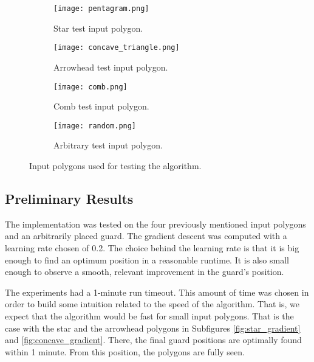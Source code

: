 \begin{figure}[h!]
    \centering
    \begin{subfigure}{0.45\textwidth}
        \centering
        \texttt{[image: pentagram.png]}
        \caption{Star test input polygon.}
        \label{fig:star}
    \end{subfigure}
    \begin{subfigure}{0.45\textwidth}
        \centering
        \texttt{[image: concave\_triangle.png]}
        \caption{Arrowhead test input polygon.}
        \label{fig:concave}
    \end{subfigure}
    \begin{subfigure}{0.45\textwidth}
        \centering
        \texttt{[image: comb.png]}
        \caption{Comb test input polygon.}
        \label{fig:comb}
    \end{subfigure}
    \begin{subfigure}{0.45\textwidth}
        \centering
        \texttt{[image: random.png]}
        \caption{Arbitrary test input polygon.}
        \label{fig:random}
    \end{subfigure}
    \caption{Input polygons used for testing the algorithm.}
\end{figure}
\subsection{Preliminary Results}
The implementation was tested on the four previously mentioned input polygons and an arbitrarily placed guard. The gradient descent was computed with a learning rate chosen of 0.2. The choice behind the learning rate is that it is big enough to find an optimum position in a reasonable runtime. It is also small enough to observe a smooth, relevant improvement in the guard's position.

The experiments had a 1-minute run timeout. This amount of time was chosen in order to build some intuition related to the speed of the algorithm. That is, we expect that the algorithm would be fast for small input polygons. That is the case with the star and the arrowhead polygons in Subfigures \ref{fig:star_gradient} and \ref{fig:concave_gradient}. There, the final guard positions are optimally found within 1 minute. From this position, the polygons are fully seen.

